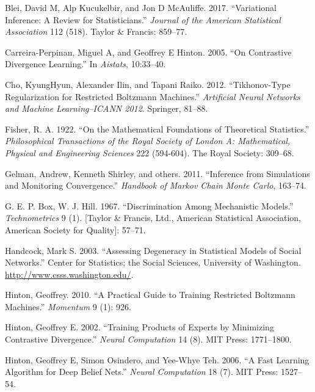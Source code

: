 \documentclass[]{article}
\theoremstyle{definition}
\begin{document}
\hypertarget{refs}{}
\leavevmode\hypertarget{ref-blei2017variational}{}%
Blei, David M, Alp Kucukelbir, and Jon D McAuliffe. 2017. ``Variational
Inference: A Review for Statisticians.'' \emph{Journal of the American
Statistical Association} 112 (518). Taylor \& Francis: 859--77.

\leavevmode\hypertarget{ref-carreira2005contrastive}{}%
Carreira-Perpinan, Miguel A, and Geoffrey E Hinton. 2005. ``On
Contrastive Divergence Learning.'' In \emph{Aistats}, 10:33--40.

\leavevmode\hypertarget{ref-cho2012tikhonov}{}%
Cho, KyungHyun, Alexander Ilin, and Tapani Raiko. 2012. ``Tikhonov-Type
Regularization for Restricted Boltzmann Machines.'' \emph{Artificial
Neural Networks and Machine Learning--ICANN 2012}. Springer, 81--88.

\leavevmode\hypertarget{ref-fisher1922mathematical}{}%
Fisher, R. A. 1922. ``On the Mathematical Foundations of Theoretical
Statistics.'' \emph{Philosophical Transactions of the Royal Society of
London A: Mathematical, Physical and Engineering Sciences} 222
(594-604). The Royal Society: 309--68.

\leavevmode\hypertarget{ref-gelman2011inference}{}%
Gelman, Andrew, Kenneth Shirley, and others. 2011. ``Inference from
Simulations and Monitoring Convergence.'' \emph{Handbook of Markov Chain
Monte Carlo}, 163--74.

\leavevmode\hypertarget{ref-box1967discrimination}{}%
G. E. P. Box, W. J. Hill. 1967. ``Discrimination Among Mechanistic
Models.'' \emph{Technometrics} 9 (1). {[}Taylor \& Francis, Ltd.,
American Statistical Association, American Society for Quality{]}:
57--71.

\leavevmode\hypertarget{ref-handcock2003assessing}{}%
Handcock, Mark S. 2003. ``Assessing Degeneracy in Statistical Models of
Social Networks.'' Center for Statistics; the Social Sciences,
University of Washington. \url{http://www.csss.washington.edu/}.

\leavevmode\hypertarget{ref-hinton2010practical}{}%
Hinton, Geoffrey. 2010. ``A Practical Guide to Training Restricted
Boltzmann Machines.'' \emph{Momentum} 9 (1): 926.

\leavevmode\hypertarget{ref-hinton2002training}{}%
Hinton, Geoffrey E. 2002. ``Training Products of Experts by Minimizing
Contrastive Divergence.'' \emph{Neural Computation} 14 (8). MIT Press:
1771--1800.

\leavevmode\hypertarget{ref-hinton2006fast}{}%
Hinton, Geoffrey E, Simon Osindero, and Yee-Whye Teh. 2006. ``A Fast
Learning Algorithm for Deep Belief Nets.'' \emph{Neural Computation} 18
(7). MIT Press: 1527--54.
\end{document}
